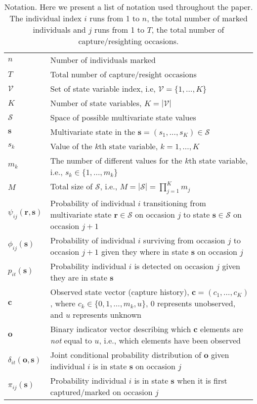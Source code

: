 \documentclass[fleqn]{article}
\newcommand{\bs}{\ensuremath{\mathbf{s}}}
\newcommand{\bc}{\ensuremath{\mathbf{c}}}
\newcommand{\fS}{\ensuremath{\mathcal{S}}}
\newcommand{\br}{\ensuremath{\mathbf{r}}}
\newcommand{\bo}{\ensuremath{\mathbf{o}}}
\newcommand{\fV}{\ensuremath{\mathcal{V}}}
\begin{document}
\begin{table}[ht]
\centering
\parbox{\textwidth}{\caption{Notation. Here we present a list of notation used throughout the paper. The individual index $i$ runs from 1 to $n$, the total number of marked individuals and $j$ runs from 1 to $T$, the total number of capture/resighting occasions.}}\medskip \\
\begin{tabulary}{\textwidth}{lL}
\hline
$n$ & Number of individuals marked\\
$T$ & Total number of capture/resight occasions\\
$\mathcal{V}$ & Set of state variable index, i.e, $\fV = \{1,\dots,K\}$\\
$K$ & Number of state variables, $K=|\fV|$\\
$\mathcal{S}$ & Space of possible multivariate state values\\
$\bs$ & Multivariate state in the $\bs = (s_{1},\dots,s_{K}) \in \mathcal{S}$ \\
$s_{k}$ & Value of the $k$th state variable, $k = 1,\dots,K$\\
$m_k$ & The number of different values for the $k$th state variable, i.e., $s_{k} \in \{1,\dots,m_k\}$\\
$M$ & Total size of $\mathcal{S}$, i.e., $M = |\mathcal{S}| = \prod_{j=1}^K m_j$\\
$\psi_{ij}(\br,\bs)$ & Probability of individual $i$ transitioning from multivariate state $\br\in\fS$ on occasion $j$ to state $\bs\in\fS$ on occasion $j+1$\\
$\phi_{ij}(\bs)$ & Probability of individual $i$ surviving from occasion $j$ to occasion $j+1$ given they where in state $\bs$ on occasion $j$\\
$p_{it}(\bs)$ & Probability individual $i$ is detected on occasion $j$ given they are in state $\bs$\\
$\bc$ & Observed state vector (capture history), $\bc=(c_{1},\dots,c_{K})$, where $c_{k} \in \{0,1,\dots,m_k,u\}$, 0 represents unobserved,  and $u$ represents unknown\\
$\bo$ & Binary indicator vector describing which $\bc$ elements are {\em not} equal to $u$, i.e., which elements have been observed\\
$\delta_{it}(\bo,\bs)$ & Joint conditional probability distribution of $\bo$ given individual $i$ is in state $\bs$ on occasion $j$\\
$\pi_{ij}(\bs)$ & Probability individual $i$ is in state $\bs$ when it is first captured/marked on occasion $j$\\
\hline
\end{tabulary}
\end{table}
\end{document}
